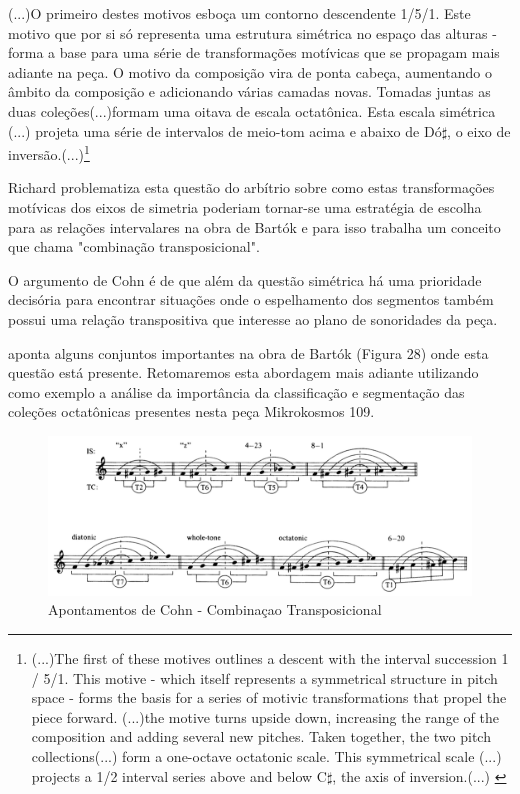 \documentclass[
	12pt,				%
	openright,			%
	twoside,			%
	a4paper,			%
	english,			%
	french,				%
	spanish,			%
	brazil				%
	]{abntex2}
\begin{document}
\begin{citacao}
(...)O primeiro destes motivos esboça um contorno descendente 1/5/1. Este motivo que por si só representa uma estrutura simétrica no espaço das alturas - forma a base para uma série de transformações motívicas que se propagam mais adiante na peça.
O motivo da composição vira de ponta cabeça, aumentando o âmbito da composição e adicionando várias camadas novas. Tomadas juntas as duas coleções(...)formam uma oitava de escala octatônica. Esta escala simétrica (...) projeta uma série de intervalos de meio-tom acima e abaixo de Dó$\sharp$, o eixo de inversão.(...)\cite[ p.33]{pearsall2004symmetry}\footnote{(...)The first of these motives outlines a descent with the interval
succession 1 / 5/1. This motive - which itself represents a symmetrical structure in pitch space - forms the basis for a series of motivic transformations that propel the piece forward. (...)the motive turns
upside down, increasing the range of the composition and adding several new pitches. Taken together, the two pitch collections(...) form a one-octave octatonic scale. This symmetrical scale (...)
projects a 1/2 interval series above and below C$\sharp$, the axis of inversion.(...) \cite[ p.33]{pearsall2004symmetry}}
\end{citacao}

Richard  problematiza esta questão do arbítrio sobre como estas transformações motívicas dos eixos de simetria poderiam tornar-se uma estratégia de escolha para as relações intervalares na obra de Bartók e para isso trabalha um conceito que chama "combinação transposicional". 

O argumento de Cohn é de que além da questão simétrica há uma prioridade decisória para encontrar situações onde o espelhamento dos segmentos também possui uma relação transpositiva que interesse ao plano de sonoridades da peça.

 aponta alguns conjuntos importantes na obra de Bartók (Figura 28) onde esta questão está presente. Retomaremos esta abordagem mais adiante utilizando como exemplo a análise da importância da classificação e segmentação das coleções octatônicas presentes nesta peça Mikrokosmos 109.\cite{cohn1991bartok}

\begin{figure}[!h]
	\caption{\label{fig_grafico}Apontamentos de Cohn - Combinaçao Transposicional}
	\begin{center}
	    \includegraphics[scale=0.4]{axis/TCCohn.png}
	\end{center}
\end{figure}
\end{document}
